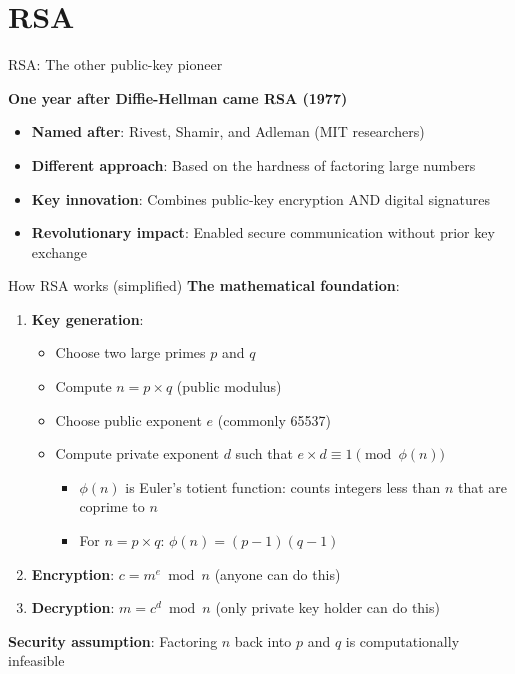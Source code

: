 \documentclass[aspectratio=169, lualatex, handout]{beamer}
\begin{document}
\section{RSA}

\begin{frame}{RSA: The other public-key pioneer}
	\begin{center}
		\Large\textbf{One year after Diffie-Hellman came RSA (1977)}
	\end{center}
	\vspace{0.5cm}
	\begin{itemize}[<+->]
		\item \textbf{Named after}: Rivest, Shamir, and Adleman (MIT researchers)
		\item \textbf{Different approach}: Based on the hardness of factoring large numbers
		\item \textbf{Key innovation}: Combines public-key encryption AND digital signatures
		\item \textbf{Revolutionary impact}: Enabled secure communication without prior key exchange
	\end{itemize}
	\vspace{0.5cm}
\end{frame}

\begin{frame}{How RSA works (simplified)}
	\textbf{The mathematical foundation}:
	\begin{enumerate}[<+->]
		\item \textbf{Key generation}:
		      \begin{itemize}
			      \item Choose two large primes $p$ and $q$
			      \item Compute $n = p \times q$ (public modulus)
			      \item Choose public exponent $e$ (commonly 65537)
			      \item Compute private exponent $d$ such that $e \times d \equiv 1 \pmod{\phi(n)}$
			            \begin{itemize}
				            \item $\phi(n)$ is Euler's totient function: counts integers less than $n$ that are coprime to $n$
				            \item For $n = p \times q$: $\phi(n) = (p-1)(q-1)$
			            \end{itemize}
		      \end{itemize}
		\item \textbf{Encryption}: $c = m^e \bmod n$ (anyone can do this)
		\item \textbf{Decryption}: $m = c^d \bmod n$ (only private key holder can do this)
	\end{enumerate}
	\vspace{0.5cm}
	\textbf{Security assumption}: Factoring $n$ back into $p$ and $q$ is computationally infeasible
\end{frame}
\end{document}
